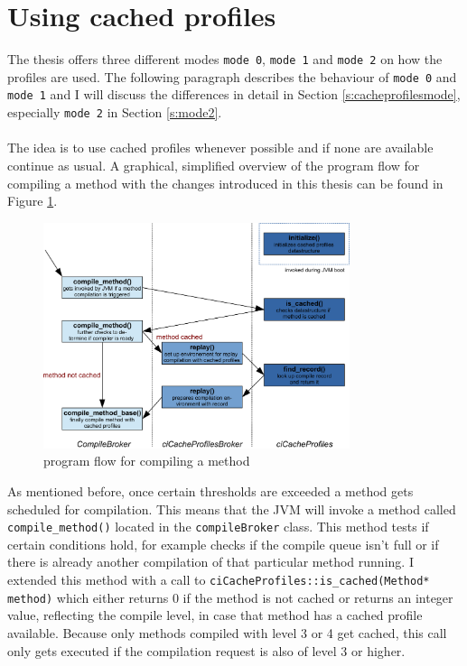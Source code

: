 \section{Using cached profiles}
\label{s:usingprofiles}
The thesis offers three different modes \texttt{mode 0}, \texttt{mode 1} and \texttt{mode 2} on how the profiles are used.
The following paragraph describes the behaviour of \texttt{mode 0} and \texttt{mode 1} and I will discuss the differences in detail in Section \ref{s:cacheprofilesmode}, especially \texttt{mode 2} in Section \ref{s:mode2}.
\\\\
The idea is to use cached profiles whenever possible and if none are available continue as usual.
A graphical, simplified overview of the program flow for compiling a method with the changes introduced in this thesis can be found in Figure \ref{f:programflow}.
\begin{figure}[h]
  \begin{center}
    \centering
    \includegraphics[width=0.8\textwidth]{figures/program_flow.png}
    \caption{program flow for compiling a method}
    \label{f:programflow}
  \end{center}
\end{figure}
As mentioned before, once certain thresholds are exceeded a method gets scheduled for compilation. This means that the JVM will invoke a method called \texttt{compile\_method()} located in the \texttt{compileBroker} class. This method tests if certain conditions hold, for example checks if the compile queue isn't full or if there is already another compilation of that particular method running.
I extended this method with a call to \texttt{ciCacheProfiles::is\_cached(Method* method)} which either returns 0 if the method is not cached or returns an integer value, reflecting the compile level, in case that method has a cached profile available. Because only methods compiled with level 3 or 4 get cached, this call only gets executed if the compilation request is also of level 3 or higher.
